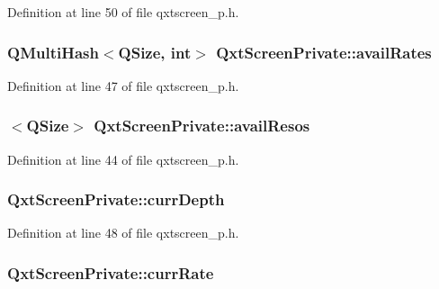Definition at line 50 of file qxtscreen\-\_\-p.\-h.

\hypertarget{class_qxt_screen_private_aad130c518bab6c03781e29bfb7548548}{
\subsubsection[{avail\-Rates}]{\setlength{\rightskip}{0pt plus 5cm}Q\-Multi\-Hash$<$Q\-Size, {\bf int}$>$ Qxt\-Screen\-Private\-::avail\-Rates}}\label{class_qxt_screen_private_aad130c518bab6c03781e29bfb7548548}


Definition at line 47 of file qxtscreen\-\_\-p.\-h.

\hypertarget{class_qxt_screen_private_a18ea3283b1bfdfcf2aae9c9284150fe9}{
\subsubsection[{avail\-Resos}]{$<$Q\-Size$>$ Qxt\-Screen\-Private\-::avail\-Resos}}\label{class_qxt_screen_private_a18ea3283b1bfdfcf2aae9c9284150fe9}


Definition at line 44 of file qxtscreen\-\_\-p.\-h.

\hypertarget{class_qxt_screen_private_a8315be33c253dfb1fdc59c6b0b5b018a}{
\subsubsection[{curr\-Depth}]{ Qxt\-Screen\-Private\-::curr\-Depth}}\label{class_qxt_screen_private_a8315be33c253dfb1fdc59c6b0b5b018a}


Definition at line 48 of file qxtscreen\-\_\-p.\-h.

\hypertarget{class_qxt_screen_private_ad21175ec23ce7082baba2070bbf4ba43}{
\subsubsection[{curr\-Rate}]{ Qxt\-Screen\-Private\-::curr\-Rate}}\label{class_qxt_screen_private_ad21175ec23ce7082baba2070bbf4ba43}


